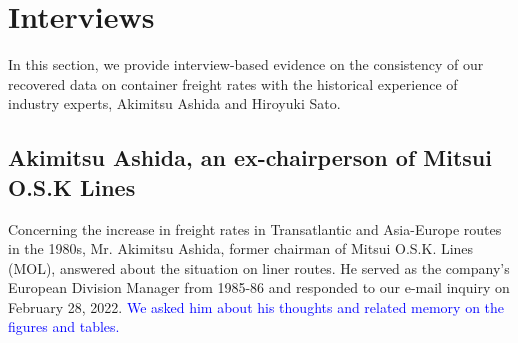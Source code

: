 \documentclass[11pt]{article}
\begin{document}




\section{Interviews}\label{sec:interview}

In this section, we provide interview-based evidence on the consistency of our recovered data on container freight rates with the historical experience of industry experts, Akimitsu Ashida and Hiroyuki Sato.

\subsection{Akimitsu Ashida, an ex-chairperson of Mitsui O.S.K Lines}

Concerning the increase in freight rates in Transatlantic and Asia-Europe routes in the 1980s, Mr. Akimitsu Ashida, former chairman of Mitsui O.S.K. Lines (MOL), answered about the situation on liner routes. He served as the company's European Division Manager from 1985-86 and responded to our e-mail inquiry on February 28, 2022. \textcolor{blue}{We asked him about his thoughts and related memory on the figures and tables.}\\
\end{document}
